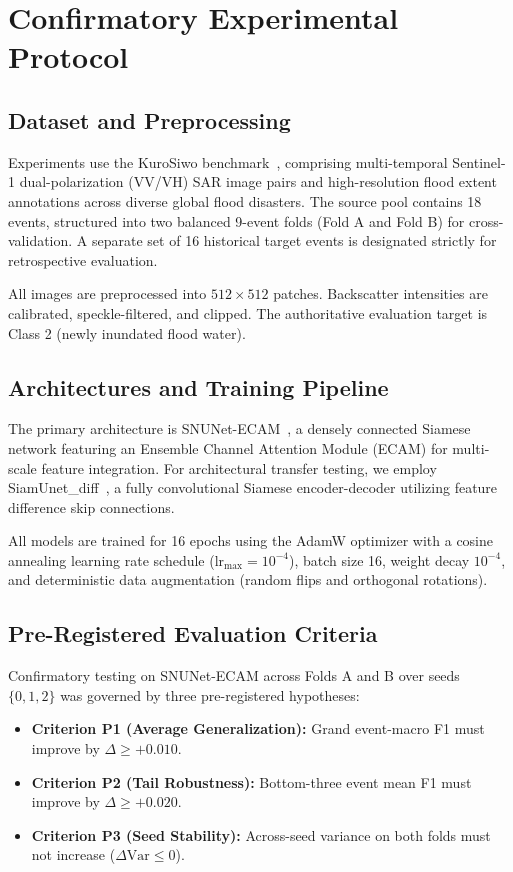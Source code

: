 \documentclass[conference]{IEEEtran}
\begin{document}
\section{Confirmatory Experimental Protocol}
\subsection{Dataset and Preprocessing}
Experiments use the KuroSiwo benchmark~\cite{bountos2023kurosiwo}, comprising multi-temporal Sentinel-1 dual-polarization (VV/VH) SAR image pairs and high-resolution flood extent annotations across diverse global flood disasters. The source pool contains 18 events, structured into two balanced 9-event folds (Fold A and Fold B) for cross-validation. A separate set of 16 historical target events is designated strictly for retrospective evaluation.

All images are preprocessed into $512 \times 512$ patches. Backscatter intensities are calibrated, speckle-filtered, and clipped. The authoritative evaluation target is Class 2 (newly inundated flood water).

\subsection{Architectures and Training Pipeline}
The primary architecture is SNUNet-ECAM~\cite{fang2021snunet}, a densely connected Siamese network featuring an Ensemble Channel Attention Module (ECAM) for multi-scale feature integration. For architectural transfer testing, we employ SiamUnet\_diff~\cite{daudt2018fully}, a fully convolutional Siamese encoder-decoder utilizing feature difference skip connections.

All models are trained for 16 epochs using the AdamW optimizer with a cosine annealing learning rate schedule ($\text{lr}_{\text{max}} = 10^{-4}$), batch size 16, weight decay $10^{-4}$, and deterministic data augmentation (random flips and orthogonal rotations).

\subsection{Pre-Registered Evaluation Criteria}
Confirmatory testing on SNUNet-ECAM across Folds A and B over seeds $\{0, 1, 2\}$ was governed by three pre-registered hypotheses:
\begin{itemize}
    \item \textbf{Criterion P1 (Average Generalization):} Grand event-macro F1 must improve by $\Delta \ge +0.010$.
    \item \textbf{Criterion P2 (Tail Robustness):} Bottom-three event mean F1 must improve by $\Delta \ge +0.020$.
    \item \textbf{Criterion P3 (Seed Stability):} Across-seed variance on both folds must not increase ($\Delta \text{Var} \le 0$).
\end{itemize}
\end{document}
